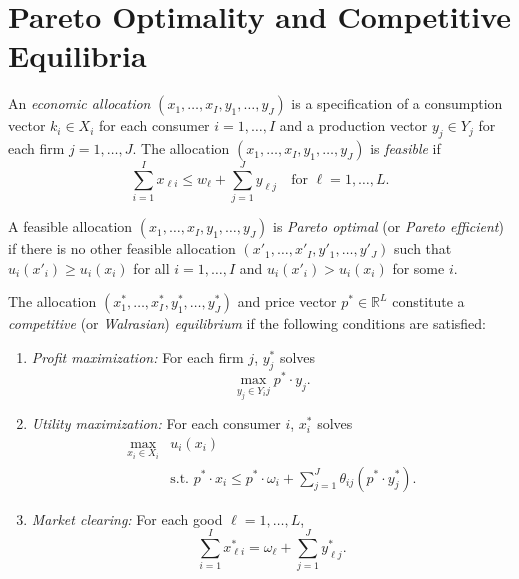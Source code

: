 \addtocounter{section}{1}

\section{Pareto Optimality and Competitive Equilibria}

\begin{defn}
    An \emph{economic allocation} $(x_1, \dots, x_I, y_1, \dots, y_J)$ is a specification of a consumption vector $k_i \in X_i$ for each consumer $i = 1, \dots, I$ and a production vector $y_j \in Y_j$ for each firm $j = 1, \dots, J$. The allocation $(x_1, \dots, x_I, y_1, \dots, y_J)$ is \emph{feasible} if 
    \begin{equation*}
        \sum_{i = 1}^I x_{\ell i} \leq w_\ell + \sum_{j = 1}^J y_{\ell j} \quad \text{for } \ell = 1, \dots, L.
    \end{equation*}
\end{defn}

\begin{defn}
    A feasible allocation $(x_1, \dots, x_I, y_1, \dots, y_J)$ is \emph{Pareto optimal} (or \emph{Pareto efficient}) if there is no other feasible allocation $(x'_1, \dots, x'_I, y'_1, \dots, y'_J)$ such that $u_i(x'_i) \geq u_i(x_i)$ for all $i = 1, \dots, I$ and $u_i(x'_i) > u_i(x_i)$ for some $i$.
\end{defn}

\begin{defn}
    The allocation $(x^*_1, \dots, x^*_I, y^*_1, \dots, y^*_J)$ and price vector $p^* \in \mathbb{R}^L$ constitute a \emph{competitive} (or \emph{Walrasian}) \emph{equilibrium} if the following conditions are satisfied:
    \begin{enumerate}
        \item 
        \emph{Profit maximization:} For each firm $j$, $y^*_j$ solves
        \begin{equation}
            \max_{y_j \in Y_ij} p^* \cdot y_j.
        \end{equation}

        \item 
        \emph{Utility maximization:} For each consumer $i$, $x^*_i$ solves
        \begin{equation}
            \begin{split}
                \max_{x_i \in X_i} &u_i(x_i) \\
                &\text{s.t. } p^* \cdot x_i \leq p^* \cdot \omega_i + \sum_{j = 1}^J \theta_{ij} (p^* \cdot y^*_j).
            \end{split}
        \end{equation}

        \item 
        \emph{Market clearing:} For each good $\ell = 1, \dots, L$,
        \begin{equation}\label{piii.chx.market-clearing}
            \sum_{i = 1}^I x^*_{\ell i} = \omega_\ell + \sum_{j = 1}^J y^*_{\ell j}.
        \end{equation}
    \end{enumerate}
\end{defn}

